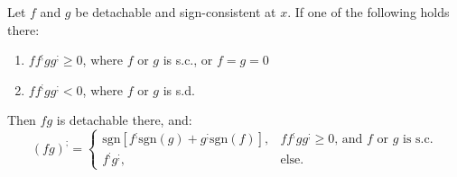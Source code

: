 \documentclass[11pt]{book}
\begin{document}
\begin{theorem}
Let $f$ and $g$ be detachable and sign-consistent at $x$. If one of the following holds there:
\begin{enumerate}
\item $ff^{;}gg^{;}\geq0$, where $f$ or $g$ is s.c., or $f=g=0$
\item $ff^{;}gg^{;}<0$, where $f$ or $g$ is s.d.
\label{product_rule}
\end{enumerate}

Then $fg$ is detachable there, and: $$\left(fg\right)^{;}=\begin{cases}
\text{sgn}\left[f^{;}\text{sgn}\left(g\right)+g^{;}\text{sgn}\left(f\right)\right], & ff^{;}gg^{;}\geq0\text{, and }f\text{ or }g\text{ is s.c.}\\
f^{;}g^{;}, & \text{else}\text{.}
\end{cases}$$
\label{product_rule}
\end{theorem}
\end{document}
